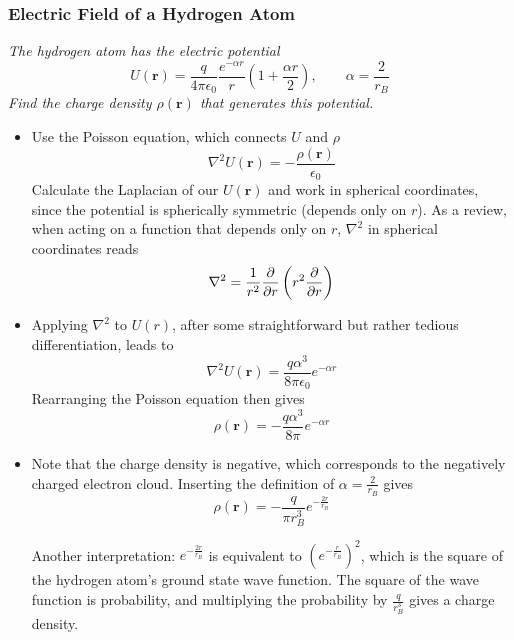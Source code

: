 \documentclass[11pt, a4paper]{article}
\renewcommand{\vec}[1]{\bm{#1}} %
\renewcommand{\r}{\vec{r}}
\newcommand{\ee}{\epsilon_{0}}  %
\begin{document}
\subsubsection{Electric Field of a Hydrogen Atom}
\textit{The hydrogen atom has the electric potential}
\begin{equation*}
	U(\r) = \frac{q}{4\pi \ee} \frac{e^{-\alpha r}}{r}\left(1 + \frac{\alpha r}{2}\right), \qquad \alpha = \frac{2}{r_{B}}
\end{equation*}
\textit{Find the charge density $ \rho(\r) $ that generates this potential.}
\begin{itemize}
	\item Use the Poisson equation, which connects $ U $ and $ \rho $
	\begin{equation*}
		\nabla^{2}U(\r) = - \frac{\rho(\r)}{\ee}
	\end{equation*}
	Calculate the Laplacian of our $ U(\r) $ and work in spherical coordinates, since the potential is spherically symmetric (depends only on $ r $). As a review, when acting on a function that depends only on $ r $, $ \nabla^{2} $ in spherical coordinates reads
	\begin{equation*}
		\nabla^{2} = \frac{1}{r^{2}} \pdv{}{r}\left(r^{2} \pdv{}{r}\right)
	\end{equation*}
	
	\item Applying $ \nabla^{2} $ to $ U(r) $, after some straightforward but rather tedious differentiation, leads to
	\begin{equation*}
		\nabla^{2}U(\r) = \frac{q\alpha^{3}}{8 \pi \ee}e^{-\alpha r}
	\end{equation*}
	Rearranging the Poisson equation then gives
	\begin{equation*}
		\rho(\r) = - \frac{q\alpha^{3}}{8 \pi}e^{-\alpha r}
	\end{equation*}
	
	\item Note that the charge density is negative, which corresponds to the negatively charged electron cloud. Inserting the definition of $ \alpha = \frac{2}{r_{B}}$ gives
	\begin{equation*}
		\rho(\r) = -\frac{q}{\pi r_{B}^{3}} e^{-\frac{2r}{r_{B}}}
	\end{equation*}
	
	Another interpretation: $ e^{-\frac{2r}{r_{B}}} $ is equivalent to $ \left(e^{-\frac{r}{r_{B}}}\right)^{2} $, which is the square of the hydrogen atom's ground state wave function. The square of the wave function is probability, and multiplying the probability by $ \frac{q}{r_{B}^{3}} $ gives a charge density. 
	

\end{itemize}
\end{document}
